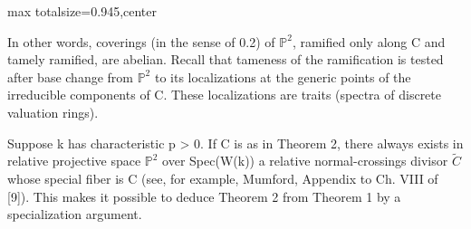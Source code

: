 \documentclass[10pt,a4paper]{article}
\begin{document}
\begin{adjustbox}{max totalsize={\textwidth}{0.945\textheight},center}
\begin{minipage}{\textwidth}
\noindent In other words, coverings (in the sense of 0.2) of \ensuremath{ℙ^2}, ramified only along C and tamely ramified, are abelian. Recall that tameness of the ramification is tested after base change from \ensuremath{ℙ^2} to its localizations at the generic points of the irreducible components of C. These localizations are traits (spectra of discrete valuation rings).\par\smallskip
\noindent Suppose k has characteristic p > 0. If C is as in Theorem 2, there always exists in relative projective space \ensuremath{ℙ^2} over Spec(W(k)) a relative normal-crossings divisor \ensuremath{\widetilde{C}} whose special fiber is C (see, for example, Mumford, Appendix to Ch. VIII of [9]). This makes it possible to deduce Theorem 2 from Theorem 1 by a specialization argument.\par\smallskip
\end{minipage}
\end{adjustbox}
\newpage
\end{document}
